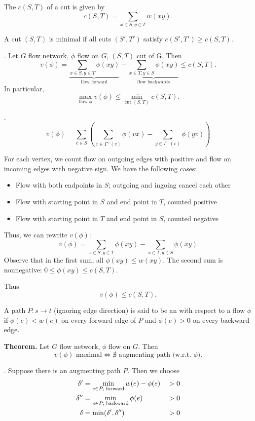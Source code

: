 \begin{definition}
The  $c(S,T)$ of a cut is given by
\[ c(S,T) = \sum_{x\in S, y\in T} w(xy). \]
\end{definition}

A cut $(S,T)$ is minimal if all cuts $(S',T')$ satisfy $c(S', T') \geq c(S,T)$.

\Lemma. Let $G$ flow network, $\phi$ flow on $G$, $(S,T)$ cut of G. Then
\[
v(\phi) = \underbrace{\sum_{x\in S, y\in T} \phi(xy)}_{\text{flow forward}}
        - \underbrace{\sum_{x\in T, y\in S} \phi(xy)}_{\text{flow backwards}}
\leq c(S,T).
\]
In particular,
\[
  \max_{\text{flow $\phi$}} v(\phi)\leq \min_{\text{cut $(S,T)$}} c(S,T).
\]

\Proof.
\[
    v(\phi) = \sum_{v\in S} \left(
        \sum_{x\in \Gamma^+(v)} \phi(vx)
      - \sum_{y\in \Gamma^-(v)} \phi(yv)
    \right)
\]

For each vertex, we count flow on outgoing edges with positive and flow on
incoming edges with negative sign. We have the following cases:
\begin{itemize}
\item Flow with both endpoints in $S$; outgoing and ingoing cancel each other
\item Flow with starting point in $S$ and end point in $T$, counted positive
\item Flow with starting point in $T$ and end point in $S$, counted negative
\end{itemize}

Thus, we can rewrite $v(\phi)$:
\[
    v(\phi) = \sum_{x\in S, y\in T} \phi(xy)
            - \sum_{x\in T, y\in S} \phi(xy)
\]
Observe that in the first sum, all $\phi (xy) \leq w(xy)$. The second sum is
nonnegative: $0 \leq \phi (xy) \leq c(S,T)$.

Thus
\[
    v(\phi) \leq c(S,T).
\]

\begin{definition}
A path $P: s\rightarrow t$ (ignoring edge direction) is said to be an  with respect to a flow $\phi$ if $\phi(e) < w(e)$ on every forward edge
of $P$ and $\phi(e) > 0$ on every backward edge.
\end{definition}

\textbf{Theorem.}
Let $G$ flow network, $\phi$ flow on $G$. Then 
\[v(\phi)\text{ maximal} \iff \nexists\text{ augmenting path (w.r.t. $\phi$)}.\]

\ProofForward.
Suppose there is an augmenting path $P$. Then we choose
\begin{alignat*}{3}
    \delta' &= \min_{e \in P,\text{ forward}} w(e) - \phi(e) &\null> 0 \\
    \delta'' &= \min_{e\in P,\text{ backward}} \phi(e) &\null> 0 \\
    \delta &= \min(\delta', \delta'') &> 0
\end{alignat*}

